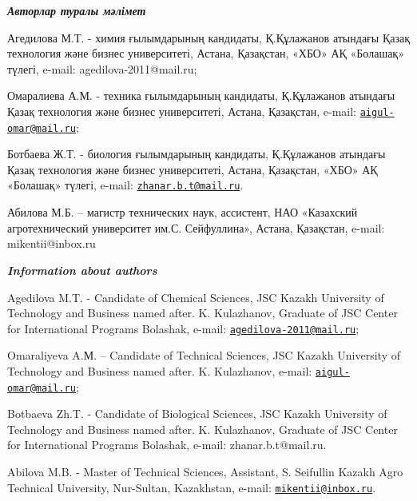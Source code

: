 \begin{authorinfo}
\hspace{1em}\emph{{\bfseries Авторлар туралы мәлімет}}

Агедилова М.Т. - химия ғылымдарының кандидаты, Қ.Құлажанов атындағы
Қазақ технология және бизнес университеті, Астана, Қазақстан, «ХБО» АҚ
«Болашақ» түлегі, e-mail: agedilova-2011@mail.ru;

Омаралиева А.М. - техника ғылымдарының кандидаты, Қ.Құлажанов атындағы
Қазақ технология және бизнес университеті, Астана, Қазақстан, e-mail:
\href{mailto:aigul-omar@mail.ru}{\nolinkurl{aigul-omar@mail.ru}};

Ботбаева Ж.Т. - биология ғылымдарының кандидаты, Қ.Құлажанов атындағы
Қазақ технология және бизнес университеті, Астана, Қазақстан, «ХБО» АҚ
«Болашақ» түлегі, e-mail:
\href{mailto:zhanar.b.t@mail.ru}{\nolinkurl{zhanar.b.t@mail.ru}}.

Абилова М.Б. -- магистр технических наук, ассистент, НАО «Казахский
агротехнический университет им.\linebreak С. Сейфуллина», Астана, Қазақстан,
e-mail: mikentii@inbox.ru

\hspace{1em}\emph{{\bfseries Information about authors}}

Agedilova M.T. - Candidate of Chemical Sciences, JSC Kazakh University
of Technology and Business named after. \linebreak  K. Kulazhanov, Graduate of JSC
Center for International Programs Bolashak, e-mail:
\href{mailto:agedilova-2011@mail.ru}{\nolinkurl{agedilova-2011@mail.ru}};

Omaraliyeva A.М. -- Candidate of Technical Sciences, JSC Kazakh
University of Technology and Business named after. \linebreak  K. Kulazhanov,
e-mail:
\href{mailto:aigul-omar@mail.ru}{\nolinkurl{aigul-omar@mail.ru}};

Botbaeva Zh.T. - Candidate of Biological Sciences, JSC Kazakh University
of Technology and Business named after. \linebreak  K. Kulazhanov, Graduate of JSC
Center for International Programs Bolashak, e-mail: zhanar.b.t@mail.ru.

Abilova M.B. - Master of Technical Sciences, Assistant, S. Seifullin
Kazakh Agro Technical University, Nur-Sultan, Kazakhstan, e-mail:
\href{mailto:mikentii@inbox.ru}{\nolinkurl{mikentii@inbox.ru}}.
\end{authorinfo}
